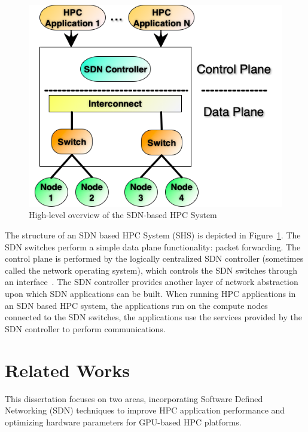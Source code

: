 \begin{figure}[h!]
  \centering
  \includegraphics[width=0.8\columnwidth]{./figs/Fig1.png}
  \caption{High-level overview of the SDN-based HPC System}
  \label{fig:sdn_hpc}
\end{figure}

The structure of an SDN based HPC System (SHS) is depicted in Figure~\ref{fig:sdn_hpc}.
The SDN switches perform a simple data plane functionality: packet forwarding. The
control plane is performed by the logically centralized
SDN controller (sometimes called the network operating system), which controls
the SDN switches through an interface~\cite{benzekki2016software}.
The SDN controller provides another layer of network abstraction upon which SDN
applications can be built. When running HPC applications in an SDN based HPC system,
the applications run on the compute nodes connected to the SDN switches,
the applications use the services provided by the SDN controller to perform
communications.




\clearpage
\section{Related Works}
This dissertation focuses on two areas, incorporating Software Defined Networking (SDN) techniques to improve HPC application performance and optimizing hardware parameters for GPU-based HPC platforms.

